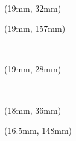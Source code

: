 \documentclass[11pt,a4paper,dvipdfmx]{ujarticle}
\begin{document}
\vspace*{20mm}
%
~\clearpage
{}
\begin{textblock*}{172mm}(19mm, 32mm)\end{textblock*}
\vspace*{151mm}
%
%
\begin{textblock*}{172mm}(19mm, 157mm)\end{textblock*}
~\clearpage
\begin{textblock*}{172mm}(19mm, 28mm)\end{textblock*}
~\clearpage
\begin{textblock*}{176mm}(18mm, 36mm)\end{textblock*}
\begin{textblock*}{177mm}(16.5mm, 148mm)\end{textblock*}
~\clearpage
{}
\vspace*{73.5mm}
%
\end{document}
